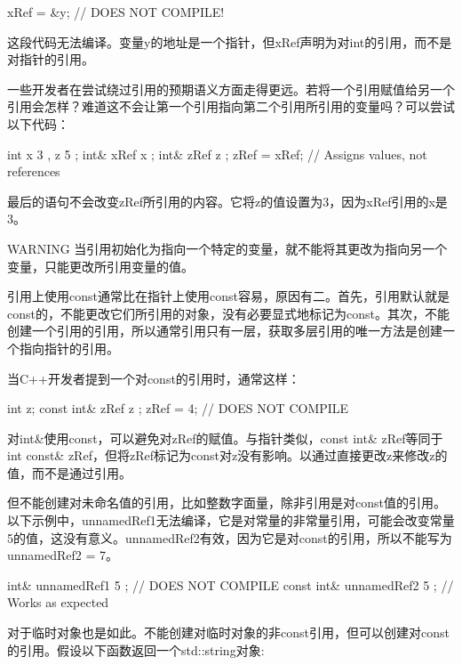 \begin{cpp}
xRef = &y; // DOES NOT COMPILE!
\end{cpp}

这段代码无法编译。变量y的地址是一个指针，但xRef声明为对int的引用，而不是对指针的引用。

一些开发者在尝试绕过引用的预期语义方面走得更远。若将一个引用赋值给另一个引用会怎样？难道这不会让第一个引用指向第二个引用所引用的变量吗？可以尝试以下代码：

\begin{cpp}
int x { 3 }, z { 5 };
int& xRef { x };
int& zRef { z };
zRef = xRef; // Assigns values, not references
\end{cpp}

最后的语句不会改变zRef所引用的内容。它将z的值设置为3，因为xRef引用的x是3。

\begin{myWarning}{WARNING}
当引用初始化为指向一个特定的变量，就不能将其更改为指向另一个变量，只能更改所引用变量的值。
\end{myWarning}


引用上使用const通常比在指针上使用const容易，原因有二。首先，引用默认就是const的，不能更改它们所引用的对象，没有必要显式地标记为const。其次，不能创建一个引用的引用，所以通常引用只有一层，获取多层引用的唯一方法是创建一个指向指针的引用。

当C++开发者提到一个对const的引用时，通常这样：

\begin{cpp}
int z;
const int& zRef { z };
zRef = 4; // DOES NOT COMPILE
\end{cpp}

对int\&使用const，可以避免对zRef的赋值。与指针类似，const int\& zRef等同于int const\& zRef，但将zRef标记为const对z没有影响。以通过直接更改z来修改z的值，而不是通过引用。

但不能创建对未命名值的引用，比如整数字面量，除非引用是对const值的引用。以下示例中，unnamedRef1无法编译，它是对常量的非常量引用，可能会改变常量5的值，这没有意义。unnamedRef2有效，因为它是对const的引用，所以不能写为unnamedRef2 = 7。

\begin{cpp}
int& unnamedRef1 { 5 }; // DOES NOT COMPILE
const int& unnamedRef2 { 5 }; // Works as expected
\end{cpp}

对于临时对象也是如此。不能创建对临时对象的非const引用，但可以创建对const的引用。假设以下函数返回一个std::string对象:


